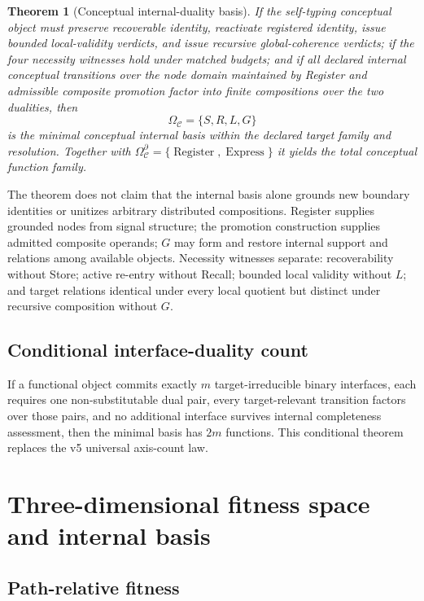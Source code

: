 \documentclass[11pt]{article}
\newtheorem{theorem}{Theorem}
\newcommand{\C}{\mathcal{C}}
\newcommand{\Register}{\operatorname{Register}}
\newcommand{\Express}{\operatorname{Express}}
\begin{document}
\begin{theorem}[Conceptual internal-duality basis]
If the self-typing conceptual object must preserve recoverable identity, reactivate registered identity, issue bounded local-validity verdicts, and issue recursive global-coherence verdicts; if the four necessity witnesses hold under matched budgets; and if all declared \emph{internal} conceptual transitions over the node domain maintained by Register and admissible composite promotion factor into finite compositions over the two dualities, then
\begin{equation}
\boxed{\Omega_{\C}=\{S,R,L,G\}}
\end{equation}
is the minimal conceptual internal basis within the declared target family and resolution. Together with $\Omega_{\C}^{\partial}=\{\Register,\Express\}$ it yields the total conceptual function family.
\end{theorem}

The theorem does not claim that the internal basis alone grounds new boundary identities or unitizes arbitrary distributed compositions. Register supplies grounded nodes from signal structure; the promotion construction supplies admitted composite operands; $G$ may form and restore internal support and relations among available objects. Necessity witnesses separate: recoverability without Store; active re-entry without Recall; bounded local validity without $L$; and target relations identical under every local quotient but distinct under recursive composition without $G$.

\subsection{Conditional interface-duality count}

If a functional object commits exactly $m$ target-irreducible binary interfaces, each requires one non-substitutable dual pair, every target-relevant transition factors over those pairs, and no additional interface survives internal completeness assessment, then the minimal basis has $2m$ functions. This conditional theorem replaces the v5 universal axis-count law.

\section{Three-dimensional fitness space and internal basis}

\subsection{Path-relative fitness}
\end{document}
